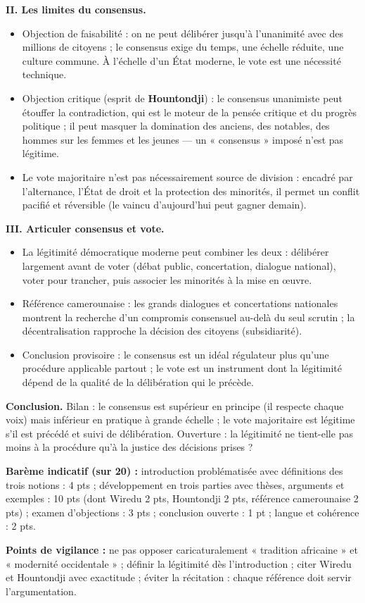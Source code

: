 \documentclass[11pt]{article}
\begin{document}
\begin{corrige}
\textbf{II. Les limites du consensus.}
\begin{itemize}
\item Objection de faisabilité : on ne peut délibérer jusqu'à l'unanimité avec des millions de citoyens ; le consensus exige du temps, une échelle réduite, une culture commune. À l'échelle d'un État moderne, le vote est une nécessité technique.
\item Objection critique (esprit de \textbf{Hountondji}) : le consensus unanimiste peut étouffer la contradiction, qui est le moteur de la pensée critique et du progrès politique ; il peut masquer la domination des anciens, des notables, des hommes sur les femmes et les jeunes — un « consensus » imposé n'est pas légitime.
\item Le vote majoritaire n'est pas nécessairement source de division : encadré par l'alternance, l'État de droit et la protection des minorités, il permet un conflit pacifié et réversible (le vaincu d'aujourd'hui peut gagner demain).
\end{itemize}

\textbf{III. Articuler consensus et vote.}
\begin{itemize}
\item La légitimité démocratique moderne peut combiner les deux : délibérer largement avant de voter (débat public, concertation, dialogue national), voter pour trancher, puis associer les minorités à la mise en œuvre.
\item Référence camerounaise : les grands dialogues et concertations nationales montrent la recherche d'un compromis consensuel au-delà du seul scrutin ; la décentralisation rapproche la décision des citoyens (subsidiarité).
\item Conclusion provisoire : le consensus est un idéal régulateur plus qu'une procédure applicable partout ; le vote est un instrument dont la légitimité dépend de la qualité de la délibération qui le précède.
\end{itemize}

\textbf{Conclusion.} Bilan : le consensus est supérieur en principe (il respecte chaque voix) mais inférieur en pratique à grande échelle ; le vote majoritaire est légitime s'il est précédé et suivi de délibération. Ouverture : la légitimité ne tient-elle pas moins à la procédure qu'à la justice des décisions prises ?

\medskip
\textbf{Barème indicatif (sur 20) :} introduction problématisée avec définitions des trois notions : 4 pts ; développement en trois parties avec thèses, arguments et exemples : 10 pts (dont Wiredu 2 pts, Hountondji 2 pts, référence camerounaise 2 pts) ; examen d'objections : 3 pts ; conclusion ouverte : 1 pt ; langue et cohérence : 2 pts.

\textbf{Points de vigilance :} ne pas opposer caricaturalement « tradition africaine » et « modernité occidentale » ; définir la légitimité dès l'introduction ; citer Wiredu et Hountondji avec exactitude ; éviter la récitation : chaque référence doit servir l'argumentation.
\end{corrige}
\end{document}
